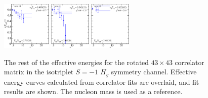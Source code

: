 \begin{figure}[H]
    \\[-0.5cm]
    \includegraphics[width=0.215\textwidth]{figures/sigmas/hg/fits/fit_36.pdf}
    \includegraphics[width=0.18\textwidth]{figures/sigmas/hg/fits/fit_37.pdf}
    \includegraphics[width=0.18\textwidth]{figures/sigmas/hg/fits/fit_41.pdf}
    \caption{The rest of the effective energies for the rotated $43\times 43$ correlator matrix in the isotriplet $S=-1$ $H_g$ symmetry channel. Effective energy curves calculated from correlator fits are overlaid, and fit results are shown. The nucleon mass is used as a reference.}\label{fig:hg_fits2}
\end{figure}

